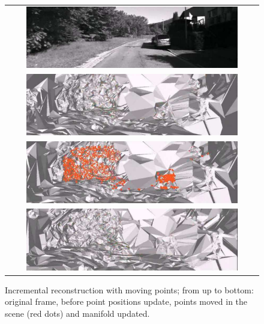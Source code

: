 \begin{figure}[bht]
\centering
\begin{tabular}{c}
\includegraphics[width = 0.86\textwidth]{./img//ExRec_cropped}\\
\includegraphics[width = 0.86\textwidth]{./img//ExRec01_cropped}\\
\includegraphics[width = 0.86\textwidth]{./img//ExRec02_cropped}\\
\includegraphics[width = 0.86\textwidth]{./img//ExRec05}\\
\end{tabular}
\caption{Incremental reconstruction with moving points; from up to bottom: original frame, before point positions update, points moved in the scene (red dots) and  manifold updated.}
\label{fig:exampleFr}
\end{figure}
 
